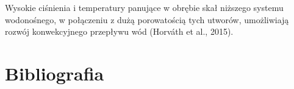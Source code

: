 \documentclass[11.5pt,twoside]{report}
\begin{document}
 Wysokie ciśnienia i temperatury panujące w obrębie skał niższego systemu wodonośnego, w połączeniu z dużą porowatością tych utworów, umożliwiają rozwój konwekcyjnego przepływu wód (Horv\'{a}th et al., 2015). 
 
 
 
 
 
 
 

%

\chapter*{Bibliografia}

\end{document}
